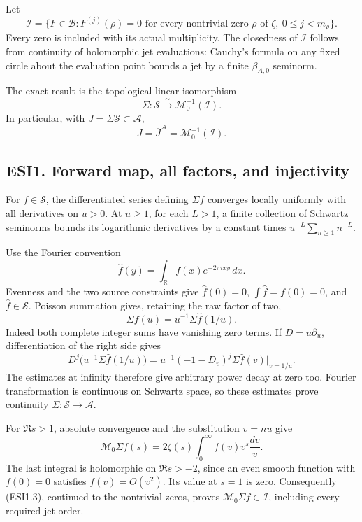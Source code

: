 Let \[
\mathcal I=\{F\in\mathcal B:F^{(j)}(\rho)=0
\text{ for every nontrivial zero }\rho\text{ of }\zeta,
\ 0\le j<m_\rho\}.
\tag{ESI0.7}
\] Every zero is included with its actual multiplicity. The closedness
of \(\mathcal I\) follows from continuity of holomorphic jet
evaluations: Cauchy's formula on any fixed circle about the evaluation
point bounds a jet by a finite \(\beta_{A,0}\) seminorm.

The exact result is the topological linear isomorphism \[
\boxed{\Sigma:\mathcal S\xrightarrow{\ \sim\ }
\mathcal M_0^{-1}(\mathcal I).}
\tag{ESI0.8}
\] In particular, with \(J=\Sigma\mathcal S\subset\mathcal A\), \[
J=\overline J^{\mathcal A}=\mathcal M_0^{-1}(\mathcal I).
\tag{ESI0.9}
\]

\subsection{ESI1. Forward map, all factors, and
injectivity}\label{esi1.-forward-map-all-factors-and-injectivity}

For \(f\in\mathcal S\), the differentiated series defining \(\Sigma f\)
converges locally uniformly with all derivatives on \(u>0\). At
\(u\ge1\), for each \(L>1\), a finite collection of Schwartz seminorms
bounds its logarithmic derivatives by a constant times
\(u^{-L}\sum_{n\ge1}n^{-L}\).

Use the Fourier convention \[
\widehat f(y)=\int_{\mathbb R}f(x)e^{-2\pi ixy}\,dx.
\] Evenness and the two source constraints give \(\widehat f(0)=0\),
\(\int\widehat f=f(0)=0\), and \(\widehat f\in\mathcal S\). Poisson
summation gives, retaining the raw factor of two, \[
\Sigma f(u)=u^{-1}\Sigma\widehat f(1/u).
\tag{ESI1.1}
\] Indeed both complete integer sums have vanishing zero terms. If
\(D=u\partial_u\), differentiation of the right side gives \[
D^j\bigl(u^{-1}\Sigma\widehat f(1/u)\bigr)
=u^{-1}(-1-D_v)^j\Sigma\widehat f(v)\big|_{v=1/u}.
\tag{ESI1.2}
\] The estimates at infinity therefore give arbitrary power decay at
zero too. Fourier transformation is continuous on Schwartz space, so
these estimates prove continuity \(\Sigma:\mathcal S\to\mathcal A\).

For \(\Re s>1\), absolute convergence and the substitution \(v=nu\) give
\[
\mathcal M_0\Sigma f(s)
=2\zeta(s)\int_0^\infty f(v)v^s\frac{dv}{v}.
\tag{ESI1.3}
\] The last integral is holomorphic on \(\Re s>-2\), since an even
smooth function with \(f(0)=0\) satisfies \(f(v)=O(v^2)\). Its value at
\(s=1\) is zero. Consequently (ESI1.3), continued to the nontrivial
zeros, proves \(\mathcal M_0\Sigma f\in\mathcal I\), including every
required jet order.

